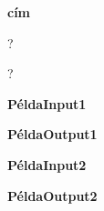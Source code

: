 



\centerline {\bf cím}
\vspace{0.5cm}
\pn

\vspace{0.5cm}
\pn ?

\vspace{0.5cm}
\pn ?

\vspace{1cm}
\noindent
{\bf PéldaInput1}


\noindent
{\bf PéldaOutput1}


\noindent
{\bf PéldaInput2}


\noindent
{\bf PéldaOutput2}




